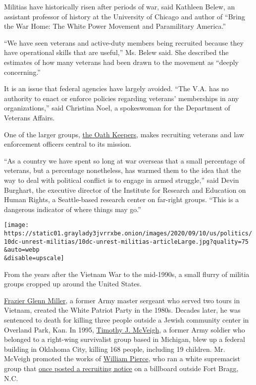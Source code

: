 Militias have historically risen after periods of war, said Kathleen
Belew, an assistant professor of history at the University of Chicago
and author of ``Bring the War Home: The White Power Movement and
Paramilitary America.''

``We have seen veterans and active-duty members being recruited because
they have operational skills that are useful,'' Ms. Belew said. She
described the estimates of how many veterans had been drawn to the
movement as ``deeply concerning.''

It is an issue that federal agencies have largely avoided. ``The V.A.
has no authority to enact or enforce policies regarding veterans'
memberships in any organizations,'' said Christina Noel, a spokeswoman
for the Department of Veterans Affairs.

One of the larger groups,
\href{https://www.adl.org/resources/profiles/the-oath-keepers}{the Oath
Keepers}, makes recruiting veterans and law enforcement officers central
to its mission.

``As a country we have spent so long at war overseas that a small
percentage of veterans, but a percentage nonetheless, has warmed them to
the idea that the way to deal with political conflict is to engage in
armed struggle,'' said Devin Burghart, the executive director of the
Institute for Research and Education on Human Rights, a Seattle-based
research center on far-right groups. ``This is a dangerous indicator of
where things may go.''

\texttt{[image: https://static01.graylady3jvrrxbe.onion/images/2020/09/10/us/politics/10dc-unrest-militias/10dc-unrest-militias-articleLarge.jpg?quality=75\\\&auto=webp\\\&disable=upscale]}

From the years after the Vietnam War to the mid-1990s, a small flurry of
militia groups cropped up around the United States.

\href{https://www.splcenter.org/fighting-hate/extremist-files/individual/frazier-glenn-miller}{Frazier
Glenn Miller}, a former Army master sergeant who served two tours in
Vietnam, created the White Patriot Party in the 1980s. Decades later, he
was sentenced to death for killing three people outside a Jewish
community center in Overland Park, Kan. In 1995,
\href{https://www.biography.com/crime-figure/timothy-mcveigh}{Timothy J.
McVeigh}, a former Army soldier who belonged to a right-wing survivalist
group based in Michigan, blew up a federal building in Oklahoma City,
killing 168 people, including 19 children. Mr. McVeigh promoted the
works of
\href{https://www.nytimes3xbfgragh.onion/2002/07/24/us/william-pierce-69-neo-nazi-leader-dies.html}{William
Pierce}, who ran a white supremacist group that
\href{https://www.nytimes3xbfgragh.onion/1995/12/21/us/for-most-gi-s-only-few-hints-of-hate-groups.html}{once
posted a recruiting notice} on a billboard outside Fort Bragg, N.C.

